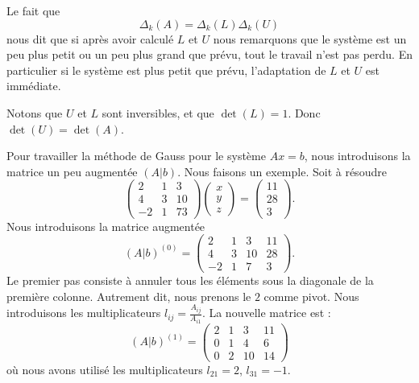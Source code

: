 \begin{normaltext}
    Le fait que
    \begin{equation}
        \Delta_k(A)=\Delta_k(L)\Delta_k(U)
    \end{equation}
    nous dit que si après avoir calculé \( L\) et \( U \) nous remarquons que le système est un peu plus petit ou un peu plus grand que prévu, tout le travail n'est pas perdu. En particulier si le système est plus petit que prévu, l'adaptation de \( L\) et \( U\) est immédiate.
\end{normaltext}

Notons que \( U\) et \( L\) sont inversibles, et que \( \det(L)=1\). Donc \( \det(U)=\det(A)\).

\begin{example}
    Pour travailler la méthode de Gauss pour le système \( Ax=b\), nous introduisons la matrice un peu augmentée \( (A|b)\). Nous faisons un exemple. Soit à résoudre
    \begin{equation}
        \begin{pmatrix}
             2   &   1    &   3       \\
             4   &   3    &   10     \\
             -2   &   1    &   7  3
         \end{pmatrix}
         \begin{pmatrix}
             x   \\
             y   \\
             z
         \end{pmatrix}=\begin{pmatrix}
             11   \\
             28   \\
             3
         \end{pmatrix}.
    \end{equation}
    Nous introduisons la matrice augmentée
    \begin{equation}
        (A|b)^{(0)}=\begin{pmatrix}
             2   &   1    &   3    &   11    \\
             4   &   3    &   10    &   28    \\
             -2   &   1    &   7    &   3
         \end{pmatrix}.
    \end{equation}
    Le premier pas consiste à annuler tous les éléments sous la diagonale de la première colonne. Autrement dit, nous prenons le \( 2\) comme pivot. Nous introduisons les multiplicateurs \( l_{ij}= \frac{ A_{ij} }{ A_{i1} }\). La nouvelle matrice est :
    \begin{equation}
        (A|b)^{(1)}=\begin{pmatrix}
             2   &   1    &   3    &   11    \\
             0   &   1    &   4    &   6    \\
             0   &   2    &   10    &   14
         \end{pmatrix}
    \end{equation}
    où nous avons utilisé les multiplicateurs \( l_{21}=2\), \( l_{31}=-1\).


\end{example}
